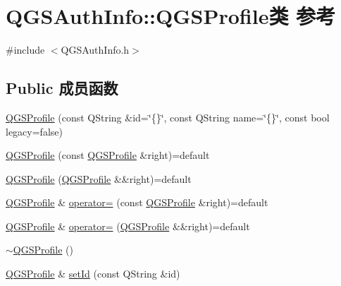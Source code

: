 \hypertarget{class_q_g_s_auth_info_1_1_q_g_s_profile}{}\section{Q\+G\+S\+Auth\+Info\+:\+:Q\+G\+S\+Profile类 参考}
\label{class_q_g_s_auth_info_1_1_q_g_s_profile}


{\ttfamily \#include $<$Q\+G\+S\+Auth\+Info.\+h$>$}

\subsection*{Public 成员函数}
\begin{DoxyCompactItemize}
\item 
\mbox{\hyperlink{class_q_g_s_auth_info_1_1_q_g_s_profile_ab0d43094da12e31ecb4a5eef7a5fd823}{Q\+G\+S\+Profile}} (const Q\+String \&id=\char`\"{}\{\}\char`\"{}, const Q\+String name=\char`\"{}\{\}\char`\"{}, const bool legacy=false)
\item 
\mbox{\hyperlink{class_q_g_s_auth_info_1_1_q_g_s_profile_a588e8a143290e7553cc8f9c61c64dbc5}{Q\+G\+S\+Profile}} (const \mbox{\hyperlink{class_q_g_s_auth_info_1_1_q_g_s_profile}{Q\+G\+S\+Profile}} \&right)=default
\item 
\mbox{\hyperlink{class_q_g_s_auth_info_1_1_q_g_s_profile_ada24d387c454bc326af20891cc6ef63e}{Q\+G\+S\+Profile}} (\mbox{\hyperlink{class_q_g_s_auth_info_1_1_q_g_s_profile}{Q\+G\+S\+Profile}} \&\&right)=default
\item 
\mbox{\hyperlink{class_q_g_s_auth_info_1_1_q_g_s_profile}{Q\+G\+S\+Profile}} \& \mbox{\hyperlink{class_q_g_s_auth_info_1_1_q_g_s_profile_a8320abec42dc150062909b862ad22df4}{operator=}} (const \mbox{\hyperlink{class_q_g_s_auth_info_1_1_q_g_s_profile}{Q\+G\+S\+Profile}} \&right)=default
\item 
\mbox{\hyperlink{class_q_g_s_auth_info_1_1_q_g_s_profile}{Q\+G\+S\+Profile}} \& \mbox{\hyperlink{class_q_g_s_auth_info_1_1_q_g_s_profile_a687c14451eec05aa3065717c4138e33e}{operator=}} (\mbox{\hyperlink{class_q_g_s_auth_info_1_1_q_g_s_profile}{Q\+G\+S\+Profile}} \&\&right)=default
\item 
\mbox{\hyperlink{class_q_g_s_auth_info_1_1_q_g_s_profile_a5ed1332491e32fd9898eba45492f456d}{$\sim$\+Q\+G\+S\+Profile}} ()
\item 
\mbox{\hyperlink{class_q_g_s_auth_info_1_1_q_g_s_profile}{Q\+G\+S\+Profile}} \& \mbox{\hyperlink{class_q_g_s_auth_info_1_1_q_g_s_profile_abd1f40a5733cc35a88b8198d08f30fa3}{set\+Id}} (const Q\+String \&id)

\end{DoxyCompactItemize}

